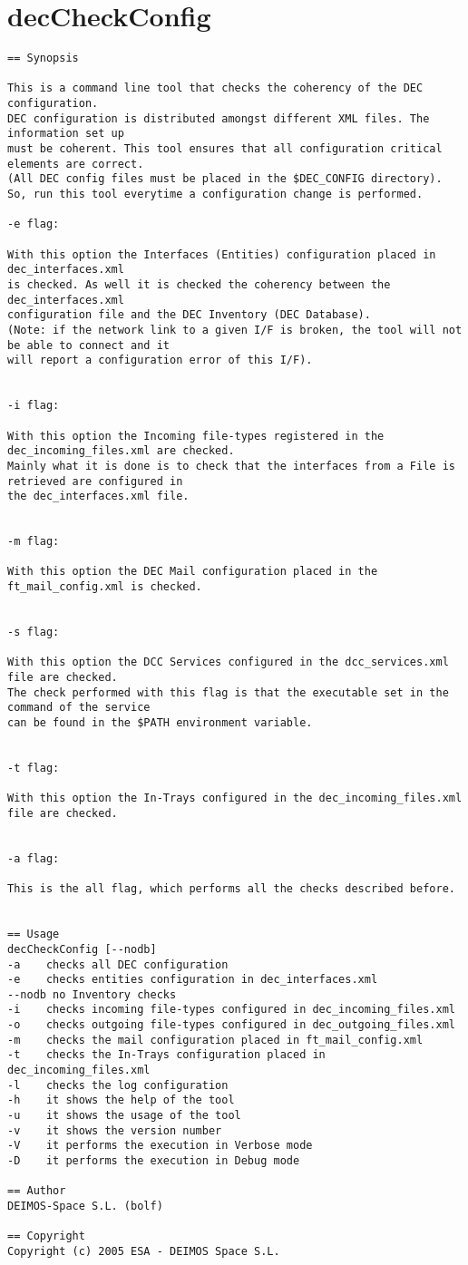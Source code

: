 \documentclass[dec_sum_main.tex]{subfiles}
\begin{document}
\section{decCheckConfig} \label{decCheckConfig}
 
\begin{verbatim}
== Synopsis

This is a command line tool that checks the coherency of the DEC configuration.
DEC configuration is distributed amongst different XML files. The information set up
must be coherent. This tool ensures that all configuration critical elements are correct.
(All DEC config files must be placed in the $DEC_CONFIG directory). 
So, run this tool everytime a configuration change is performed.

-e flag:

With this option the Interfaces (Entities) configuration placed in dec_interfaces.xml
is checked. As well it is checked the coherency between the dec_interfaces.xml
configuration file and the DEC Inventory (DEC Database).
(Note: if the network link to a given I/F is broken, the tool will not be able to connect and it
will report a configuration error of this I/F).


-i flag:

With this option the Incoming file-types registered in the dec_incoming_files.xml are checked.
Mainly what it is done is to check that the interfaces from a File is retrieved are configured in 
the dec_interfaces.xml file.


-m flag:

With this option the DEC Mail configuration placed in the ft_mail_config.xml is checked.


-s flag:

With this option the DCC Services configured in the dcc_services.xml file are checked.
The check performed with this flag is that the executable set in the command of the service
can be found in the $PATH environment variable.


-t flag:

With this option the In-Trays configured in the dec_incoming_files.xml file are checked.


-a flag:

This is the all flag, which performs all the checks described before.


== Usage
decCheckConfig [--nodb]
-a    checks all DEC configuration
-e    checks entities configuration in dec_interfaces.xml
--nodb no Inventory checks
-i    checks incoming file-types configured in dec_incoming_files.xml
-o    checks outgoing file-types configured in dec_outgoing_files.xml
-m    checks the mail configuration placed in ft_mail_config.xml
-t    checks the In-Trays configuration placed in dec_incoming_files.xml
-l    checks the log configuration
-h    it shows the help of the tool
-u    it shows the usage of the tool
-v    it shows the version number
-V    it performs the execution in Verbose mode
-D    it performs the execution in Debug mode     

== Author
DEIMOS-Space S.L. (bolf)

== Copyright
Copyright (c) 2005 ESA - DEIMOS Space S.L.

\end{verbatim}
\end{document}
